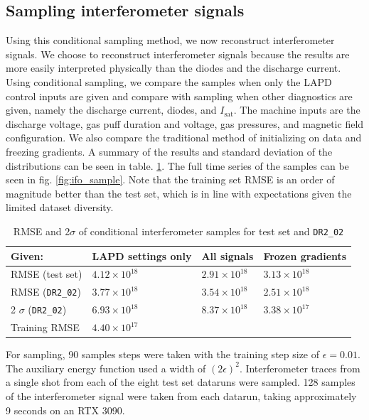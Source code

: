 \subsection{Sampling interferometer signals}

Using this conditional sampling method, we now reconstruct interferometer signals. We choose to reconstruct interferometer signals because the results are more easily interpreted physically than the diodes and the discharge current. Using conditional sampling, we compare the samples when only the LAPD control inputs are given and compare with sampling when other diagnostics are given, namely the discharge current, diodes, and $I_\text{sat}$. The machine inputs are the discharge voltage, gas puff duration and voltage, gas pressures, and magnetic field configuration. We also compare the traditional method of initializing on data and freezing gradients. A summary of the results and standard deviation of the distributions can be seen in table. \ref{tab:ifo-cond-sample}. The full time series of the samples can be seen in fig. \ref{fig:ifo_sample}. Note that the training set RMSE is an order of magnitude better than the test set, which is in line with expectations given the limited dataset diversity.

\begin{table}
\small
	\centering
	\caption{RMSE and 2$\sigma$ of conditional interferometer samples for test set and \texttt{DR2\_02}}
	\label{tab:ifo-cond-sample}
	\begin{tabular}{l l l l}
		Given: & LAPD settings only & All signals & Frozen gradients \\
		\hline
		RMSE (test set) & $4.12 \times 10^{18}$ & $2.91 \times 10^{18}$ & $3.13 \times 10^{18}$ \\
		RMSE (\texttt{DR2\_02})& $3.77 \times 10^{18}$ & $3.54 \times 10^{18}$ & $2.51 \times 10^{18}$ \\
		2 $\sigma$ (\texttt{DR2\_02}) & $6.93 \times 10^{18}$ & $8.37 \times 10^{18}$ & $3.38 \times 10^{17}$ \\
		\hline
		Training RMSE & $4.40 \times 10^{17}$ \\
	\end{tabular}
\end{table}

For sampling, 90 samples steps were taken with the training step size of $\epsilon=0.01$. The auxiliary energy function used a width of $(2\epsilon)^2$. Interferometer traces from a single shot from each of the eight test set dataruns were sampled. 128 samples of the interferometer signal were taken from each datarun, taking approximately 9 seconds on an RTX 3090. 


